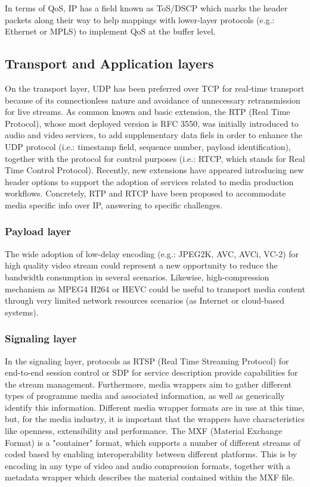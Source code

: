In terms of QoS, IP has a field known as ToS/DSCP \cite{tosdscp} which marks the header packets along their way to help mappings with lower-layer protocols (e.g.: Ethernet or MPLS) to implement QoS at the buffer level.

\subsection{Transport and Application layers}\label{S:sessionPresentationApplicatio}

On the transport layer, UDP has been preferred over TCP for real-time transport because of its connectionless nature and avoidance of unnecessary retransmission for live streams. As common known and basic extension, the RTP (Real Time Protocol), whose most deployed version is RFC 3550, was initially introduced to audio and video services, to add supplementary data fiels in order to enhance the UDP protocol (i.e.: timestamp field, sequence number, payload identification), together with the protocol for control purposes (i.e.: RTCP, which stands for Real Time Control Protocol). Recently, new extensions have appeared introducing new header options to support the adoption of services related to media production workflows. Concretely, RTP and RTCP have been proposed to accommodate media specific info over IP, answering to specific challenges.

\subsubsection{Payload layer}

The wide adoption of low-delay encoding (e.g.: JPEG2K, AVC, AVCi, VC-2) for high quality video stream could represent a new opportunity to reduce the bandwidth consumption in several scenarios. Likewise, high-compression mechanism as MPEG4 H264 or HEVC could be useful to transport media content through very limited network resources scenarios (as Internet or cloud-based systems).

\subsubsection{Signaling layer}

In the signaling layer, protocols as RTSP (Real Time Streaming Protocol) for end-to-end session control or SDP for service description provide capabilities for the stream management. Furthermore, media wrappers aim to gather different types of programme media and associated information, as well as generically identify this information. Different media wrapper formats are in use at this time, but, for the media industry, it is important that the wrappers have characteristics like openness, extensibility and performance. The MXF (Material Exchange Format) is a "container" format, which supports a number of different streams of coded based by enabling interoperability between different platforms. This is by encoding in any type of video and audio compression formats, together with a metadata wrapper which describes the material contained within the MXF file. 

